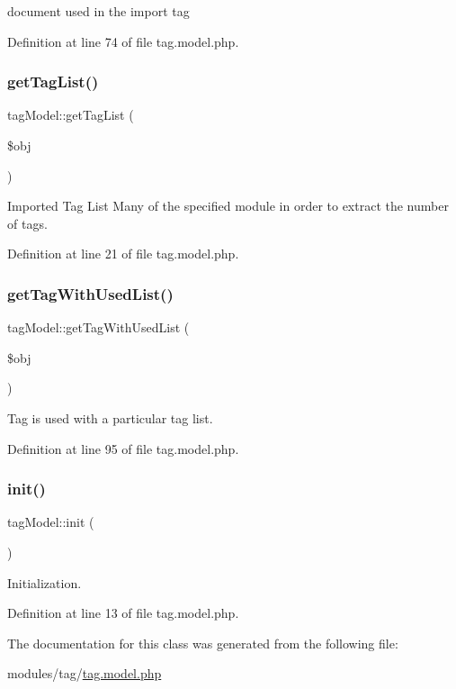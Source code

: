 document used in the import tag 



Definition at line 74 of file tag.\+model.\+php.

\mbox{\label{classtagModel_adb9465eef985504d91a2b8673e4339f3}} 
\subsubsection{\texorpdfstring{get\+Tag\+List()}{getTagList()}}
{\footnotesize\ttfamily tag\+Model\+::get\+Tag\+List (\begin{DoxyParamCaption}\item[{}]{\$obj }\end{DoxyParamCaption})}



Imported Tag List Many of the specified module in order to extract the number of tags. 



Definition at line 21 of file tag.\+model.\+php.

\mbox{\label{classtagModel_aa585bee0000c45b8f5a9fbf253926c59}} 
\subsubsection{\texorpdfstring{get\+Tag\+With\+Used\+List()}{getTagWithUsedList()}}
{\footnotesize\ttfamily tag\+Model\+::get\+Tag\+With\+Used\+List (\begin{DoxyParamCaption}\item[{}]{\$obj }\end{DoxyParamCaption})}



Tag is used with a particular tag list. 



Definition at line 95 of file tag.\+model.\+php.

\mbox{\label{classtagModel_ad408b1b4892a6637b1ac70250d37b8a6}} 
\subsubsection{\texorpdfstring{init()}{init()}}
{\footnotesize\ttfamily tag\+Model\+::init (\begin{DoxyParamCaption}{ }\end{DoxyParamCaption})}



Initialization. 



Definition at line 13 of file tag.\+model.\+php.



The documentation for this class was generated from the following file\+:\begin{DoxyCompactItemize}
\item 
modules/tag/\hyperlink{tag_8model_8php}{tag.\+model.\+php}\end{DoxyCompactItemize}
